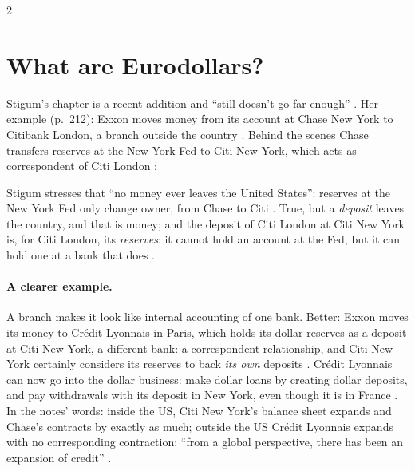 \begin{paracol}{2}
\section{What are Eurodollars?}\label{sec:ed-what}

Stigum's chapter is a recent addition and ``still doesn't go far enough'' . Her example (p.~212): Exxon moves money from its account at Chase New
York to Citibank London, a branch outside the country . Behind the scenes Chase transfers reserves at the New York Fed to
Citi New York, which acts as correspondent of Citi London :
\begin{taccts}
\quad
{}

\medskip
{}\quad
{}
\end{taccts}
Stigum stresses that ``no money ever leaves the United States'': reserves at the New York Fed only change owner, from Chase to Citi . True,
but a \emph{deposit} leaves the country, and that is money; and the deposit of Citi London at Citi New York is, for Citi London, its \emph{reserves}: it cannot hold an
account at the Fed, but it can hold one at a bank that does .

\paragraph{A clearer example.} A branch makes it look like internal accounting of one bank. Better: Exxon moves its money to Crédit Lyonnais in Paris, which holds its
dollar reserves as a deposit at Citi New York, a different bank: a correspondent relationship, and Citi New York certainly considers its reserves to back \emph{its own}
deposits . Crédit Lyonnais can now go into the dollar business: make dollar loans by creating dollar deposits, and
pay withdrawals with its deposit in New York, even though it is in France . In the notes' words: inside the US, Citi New York's balance sheet expands
and Chase's contracts by exactly as much; outside the US Crédit Lyonnais expands with no corresponding contraction: ``from a global perspective, there has been an expansion
of credit'' .


\end{paracol}
